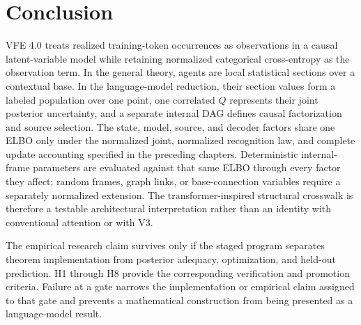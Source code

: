 \section{Conclusion}

VFE 4.0 treats realized training-token occurrences as observations in a causal latent-variable model while retaining normalized categorical cross-entropy as the observation term. In the general theory, agents are local statistical sections over a contextual base. In the language-model reduction, their section values form a labeled population over one point, one correlated $Q$ represents their joint posterior uncertainty, and a separate internal DAG defines causal factorization and source selection. The state, model, source, and decoder factors share one ELBO only under the normalized joint, normalized recognition law, and complete update accounting specified in the preceding chapters. Deterministic internal-frame parameters are evaluated against that same ELBO through every factor they affect; random frames, graph links, or base-connection variables require a separately normalized extension. The transformer-inspired structural crosswalk is therefore a testable architectural interpretation rather than an identity with conventional attention or with V3.

The empirical research claim survives only if the staged program separates theorem implementation from posterior adequacy, optimization, and held-out prediction. H1 through H8 provide the corresponding verification and promotion criteria. Failure at a gate narrows the implementation or empirical claim assigned to that gate and prevents a mathematical construction from being presented as a language-model result.
